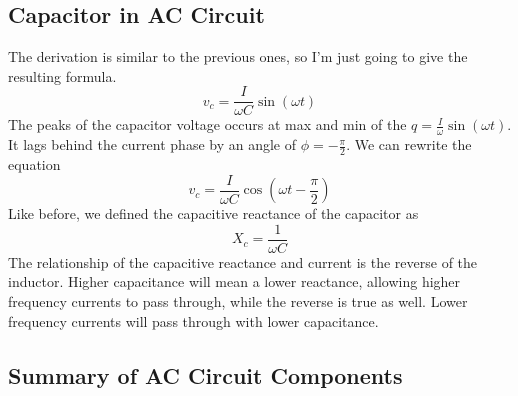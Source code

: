 \subsection{Capacitor in AC Circuit}
The derivation is similar to the previous ones, so I'm just going to give the resulting formula. 
\begin{equation*}
	v_c = \frac{I}{\omega C}\sin(\omega t)
\end{equation*}
The peaks of the capacitor voltage occurs at max and min of the $q = \frac{I}{\omega}\sin(\omega t)$. It lags behind the current phase by an angle of $\phi = -\frac{\pi}{2}$.
We can rewrite the equation
\begin{equation*}
	v_c = \frac{I}{\omega C}\cos(\omega t - \frac{\pi}{2})	
\end{equation*} 
Like before, we defined the capacitive reactance of the capacitor as 
\begin{equation*}
	X_c = \frac{1}{\omega C}
\end{equation*}
The relationship of the capacitive reactance and current is the reverse of the inductor. Higher capacitance will mean a lower reactance, allowing higher frequency currents to pass through, while the reverse is true as well. Lower frequency currents will pass through with lower capacitance. 
\subsection{Summary of AC Circuit Components}
